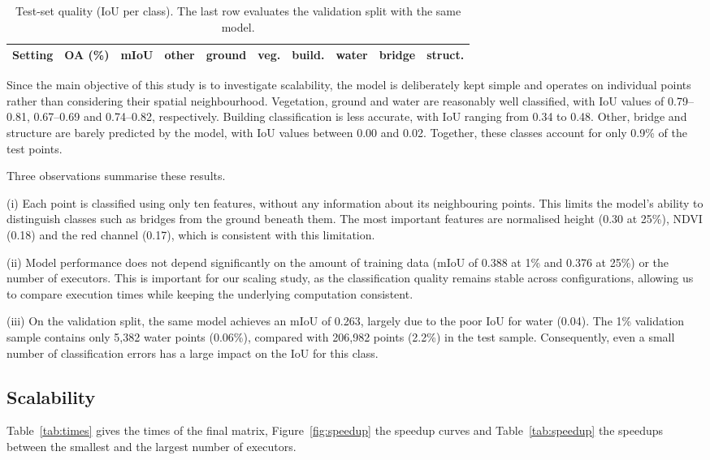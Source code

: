 \documentclass[a4paper, 11pt]{article} %
\begin{document}
\begin{table}[htbp]
\centering
\footnotesize
\begin{tabular}{@{}lrrrrrrrrr@{}}
\hline
Setting & OA (\%) & mIoU & other & ground & veg. & build. & water & bridge & struct. \\
\hline

\end{tabular}
\caption{Test-set quality (IoU per class). The last row evaluates the validation split with the same model.}
\label{tab:quality}
\end{table}

Since the main objective of this study is to investigate scalability, the model is deliberately kept simple and operates on individual points rather than considering their spatial neighbourhood. Vegetation, ground and water are reasonably well classified, with IoU values of 0.79--0.81, 0.67--0.69 and 0.74--0.82, respectively. Building classification is less accurate, with IoU ranging from 0.34 to 0.48. Other, bridge and structure are barely predicted by the model, with IoU values between 0.00 and 0.02. Together, these classes account for only 0.9\% of the test points.

Three observations summarise these results.

(i) Each point is classified using only ten features, without any information about its neighbouring points. This limits the model's ability to distinguish classes such as bridges from the ground beneath them. The most important features are normalised height (0.30 at 25\%), NDVI (0.18) and the red channel (0.17), which is consistent with this limitation.

(ii) Model performance does not depend significantly on the amount of training data (mIoU of 0.388 at 1\% and 0.376 at 25\%) or the number of executors. This is important for our scaling study, as the classification quality remains stable across configurations, allowing us to compare execution times while keeping the underlying computation consistent.

(iii) On the validation split, the same model achieves an mIoU of 0.263, largely due to the poor IoU for water (0.04). The 1\% validation sample contains only 5,382 water points (0.06\%), compared with 206,982 points (2.2\%) in the test sample. Consequently, even a small number of classification errors has a large impact on the IoU for this class.

\subsection{Scalability}
Table~\ref{tab:times} gives the times of the final matrix, Figure~\ref{fig:speedup} the speedup curves and Table~\ref{tab:speedup} the speedups between the smallest and the largest number of executors.
\end{document}
